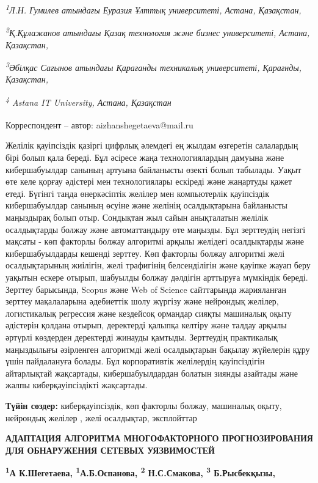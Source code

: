 \emph{\textsuperscript{1}Л.Н. Гумилев атындағы Еуразия Ұлттық
университеті, Астана, Қазақстан,}

\emph{\textsuperscript{2}Қ.Құлажанов атындағы Қазақ технология және
бизнес университеті, Астана, Қазақстан,}

\emph{\textsuperscript{3}Әбілқас Сағынов атындағы Қарағанды техникалық
университеті, Қарағнды, Қазақстан,}

\emph{\textsuperscript{4} Astana IT University, Астана, Қазақстан}

{\bfseries \textsuperscript{\envelope }}Корреспондент -- автор:
aizhanshegetaeva@mail.ru

Желілік қауіпсіздік қазіргі цифрлық әлемдегі ең жылдам өзгеретін
салалардың бірі болып қала береді. Бұл әсіресе жаңа технологиялардың
дамуына және кибершабуылдар санының артуына байланысты өзекті болып
табылады. Уақыт өте келе қорғау әдістері мен технологиялары ескіреді
және жаңартуды қажет етеді. Бүгінгі таңда өнеркәсіптік желілер мен
компьютерлік қауіпсіздік кибершабуылдар санының өсуіне және желінің
осалдықтарына байланысты маңыздырақ болып отыр. Сондықтан жыл сайын
анықталатын желілік осалдықтарды болжау және автоматтандыру өте маңызды.
Бұл зерттеудің негізгі мақсаты - көп факторлы болжау алгоритмі арқылы
желідегі осалдықтарды және кибершабуылдарды кешенді зерттеу. Көп
факторлы болжау алгоритмі желі осалдықтарының жиілігін, желі трафигінің
белсенділігін және қауіпке жауап беру уақытын ескере отырып, шабуылды
болжау дәлдігін арттыруға мүмкіндік береді. Зерттеу барысында, Scopus
және Web of Science сайттарында жарияланған зерттеу мақалаларына
әдебиеттік шолу жүргізу және нейрондық желілер, логистикалық регрессия
және кездейсоқ ормандар сияқты машиналық оқыту әдістерін қолдана отырып,
деректерді қалыпқа келтіру және талдау арқылы әртүрлі көздерден
деректерді жинауды қамтыды. Зерттеудің практикалық маңыздылығы
әзірленген алгоритмді желі осалдықтарын бақылау жүйелерін құру үшін
пайдалануға болады. Бұл корпоративтік желілердің қауіпсіздігін
айтарлықтай жақсартады, кибершабуылдардан болатын зиянды азайтады және
жалпы киберқауіпсіздікті жақсартады.

{\bfseries Түйін сөздер:} киберқауіпсіздік, көп факторлы болжау, машиналық
оқыту, нейрондық желілер , желі осалдықтар, эксплойттар

{\bfseries АДАПТАЦИЯ АЛГОРИТМА МНОГОФАКТОРНОГО ПРОГНОЗИРОВАНИЯ ДЛЯ
ОБНАРУЖЕНИЯ СЕТЕВЫХ УЯЗВИМОСТЕЙ}

{\bfseries \textsuperscript{1}А К.Шегетаева\textsuperscript{\envelope },
\textsuperscript{1}А.Б.Оспанова, \textsuperscript{2} Н.С.Смакова,
\textsuperscript{3} Б.Рысбекқызы,}

